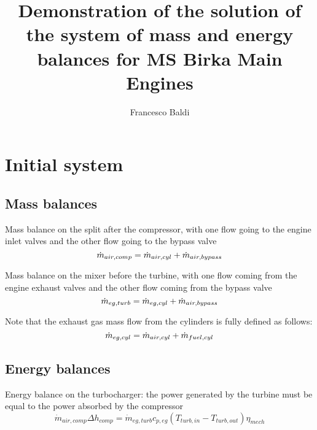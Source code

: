 \documentclass[]{article}
\title{Demonstration of the solution of the system of mass and energy balances for MS Birka Main Engines}
\author{Francesco Baldi}
\begin{document}
\maketitle

\begin{abstract}

\end{abstract}

\section{Initial system}

\subsection{Mass balances}

Mass balance on the split after the compressor, with one flow going to the engine inlet valves and the other flow going to the bypass valve
\begin{equation}
\dot{m}_{air,comp} = \dot{m}_{air,cyl} + \dot{m}_{air,bypass} \\
\end{equation}

Mass balance on the mixer before the turbine, with one flow coming from the engine exhaust valves and the other flow coming from the bypass valve
\begin{equation}
\dot{m}_{eg,turb} = \dot{m}_{eg,cyl} + \dot{m}_{air,bypass} \\
\end{equation}

Note that the exhaust gas mass flow from the cylinders is fully defined as follows:
\begin{equation}
\dot{m}_{eg,cyl} = \dot{m}_{air,cyl} + \dot{m}_{fuel,cyl} \\
\end{equation}

\subsection{Energy balances}

Energy balance on the turbocharger: the power generated by the turbine must be equal to the power absorbed by the compressor
\begin{equation}
\dot{m}_{air,comp} \Delta h_{comp} = \dot{m}_{eg,turb} c_{p,eg} (T_{turb,in} - T_{turb,out}) \eta_{mech}
\end{equation}
\end{document}
